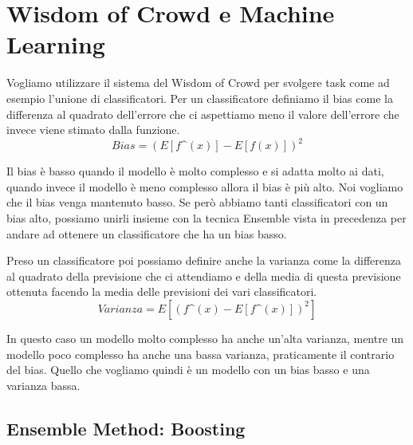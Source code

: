 \documentclass[14pt]{extreport}
\begin{document}
\section{Wisdom of Crowd e Machine Learning}

Vogliamo utilizzare il sistema del Wisdom of Crowd per svolgere task come ad esempio l'unione di classificatori.
Per un classificatore definiamo il bias come la differenza al quadrato dell'errore che ci aspettiamo meno il valore dell'errore che invece viene stimato dalla funzione.
\begin{equation}
    Bias = (E[f\^(x)] - E[f(x)])^2
\end{equation}

Il bias è basso quando il modello è molto complesso e si adatta molto ai dati, quando invece il modello è meno complesso allora il bias è più alto. Noi vogliamo che il bias venga mantenuto basso.
Se però abbiamo tanti classificatori con un bias alto, possiamo unirli insieme con la tecnica Ensemble vista in precedenza per andare ad ottenere un classificatore che ha un bias basso.

Preso un classificatore poi possiamo definire anche la varianza come la differenza al quadrato della previsione che ci attendiamo e della media di questa previsione ottenuta facendo la media delle previsioni dei vari classificatori.
\begin{equation}
    Varianza = E[(f\^(x) - E[f\^(x)])^2]
\end{equation}

In questo caso un modello molto complesso ha anche un'alta varianza, mentre un modello poco complesso ha anche una bassa varianza, praticamente il contrario del bias.
Quello che vogliamo quindi è un modello con un bias basso e una varianza bassa.

\subsection{Ensemble Method: Boosting}
\end{document}
